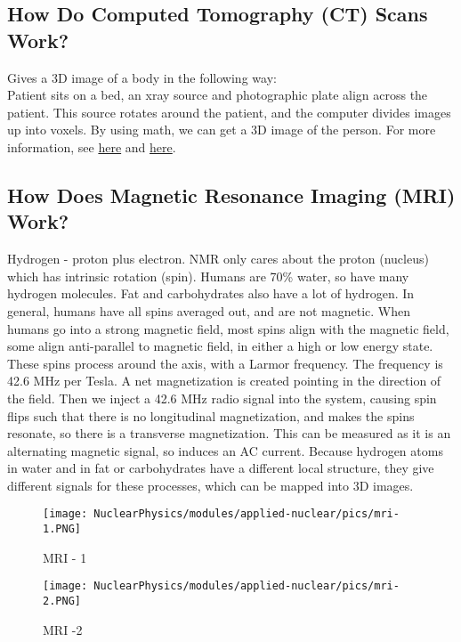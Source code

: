         \subsection{How Do Computed Tomography (CT) Scans Work?}
            \indent Gives a 3D image of a body in the following way:\\
            \indent Patient sits on a bed, an xray source and photographic plate align across the patient. This source rotates around the patient, and the computer divides images up into voxels. By using math, we can get a 3D image of the person. For more information, see \href{https://www.youtube.com/watch?v=BmkdAqd5ReY}{here} and \href{https://www.youtube.com/watch?v=9SUHgtREWQc}{here}.
            
        \subsection{How Does Magnetic Resonance Imaging (MRI) Work?}
            \indent Hydrogen - proton plus electron. NMR only cares about the proton (nucleus) which has intrinsic rotation (spin). Humans are 70\% water, so have many hydrogen molecules. Fat and carbohydrates also have a lot of hydrogen. In general, humans have all spins averaged out, and are not magnetic. When humans go into a strong magnetic field, most spins align with the magnetic field, some align anti-parallel to magnetic field, in either a high or low energy state. These spins process around the axis, with a Larmor frequency. The frequency is 42.6 MHz per Tesla. A net magnetization is created pointing in the direction of the field. Then we inject a 42.6 MHz radio signal into the system, causing spin flips such that there is no longitudinal magnetization, and makes the spins resonate, so there is a transverse magnetization. This can be measured as it is an alternating magnetic signal, so induces an AC current. Because hydrogen atoms in water and in fat or carbohydrates have a different local structure, they give different signals for these processes, which can be mapped into 3D images. 
                        
            \begin{figure}[H]
    			\centering
    			\texttt{[image: NuclearPhysics/modules/applied-nuclear/pics/mri-1.PNG]}
    			\caption{MRI - 1}
    		\end{figure}
            
            \begin{figure}[H]
    			\centering
    			\texttt{[image: NuclearPhysics/modules/applied-nuclear/pics/mri-2.PNG]}
    			\caption{MRI -2}
    		\end{figure}
            
